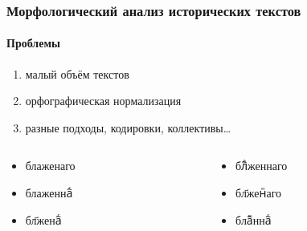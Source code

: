 \begin{frame}
  \frametitle{Морфологический анализ исторических текстов}
  \framesubtitle{Проблемы}

  \begin{enumerate}
    \item малый объём текстов
    \item<2-> орфографическая нормализация
    \item<3-> разные подходы, кодировки, коллективы\ldots
  \end{enumerate}

  \begin{columns}[c]
    \begin{column}{5cm}
      \begin{itemize}
        \item {\agio блаженаго}
        \item {\agio блаженна҇ⷢ}
        \item {\agio бл҃жена҇ⷢ}
      \end{itemize}
    \end{column}

    \begin{column}{5cm}
      \begin{itemize}
        \item {\agio бл҇ⷶженнаго}
        \item {\agio бл҃женⷩаго}
        \item {\agio бла҇ⷤнна҇ⷢ}
      \end{itemize}
    \end{column}
  \end{columns}
\end{frame}


